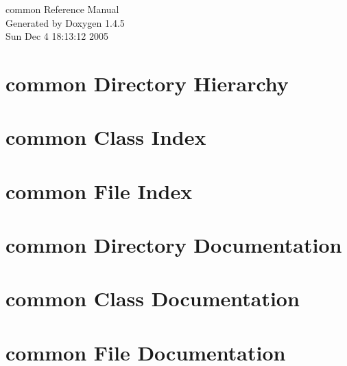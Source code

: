 \documentclass[a4paper]{book}
\begin{document}
\begin{titlepage}
\vspace*{7cm}
\begin{center}
{\Large common Reference Manual}\\
\vspace*{1cm}
{\large Generated by Doxygen 1.4.5}\\
\vspace*{0.5cm}
{\small Sun Dec 4 18:13:12 2005}\\
\end{center}
\end{titlepage}
\clearemptydoublepage
{}
\tableofcontents
\clearemptydoublepage
{}
\chapter{common Directory Hierarchy}

\chapter{common Class Index}

\chapter{common File Index}

\chapter{common Directory Documentation}

\chapter{common Class Documentation}









\chapter{common File Documentation}















\printindex
\end{document}

